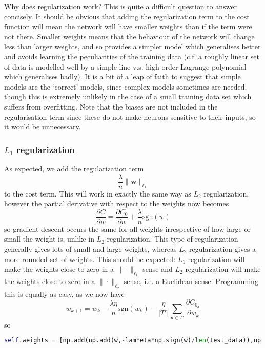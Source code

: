 \documentclass[10pt]{article}
\begin{document}
\par
Why does regularization work? This is quite a difficult question to answer concisely. It should be obvious that adding the regularization term to the cost function will mean the network will have smaller weights than if the term were not there. Smaller weights means that the behaviour of the network will change less than larger weights, and so provides a simpler model which generalises better and avoids learning the peculiarities of the training data (c.f. a roughly linear set of data is modelled well by a simple line v.s. high order Lagrange polynomial which generalises badly). It is a bit of a leap of faith to suggest that simple models are the `correct' models, since complex models sometimes are needed, though this is extremely unlikely in the case of a small training data set which suffers from overfitting. Note that the biases are not included in the regularisation term since these do not make neurons sensitive to their inputs, so it would be unnecessary.

\subsubsection{$L_1$ regularization}
As expected, we add the regularization term
\[
\frac{\lambda}{n}\|\textbf{w}\|_{\ell_1}
\]
to the cost term. This will work in exactly the same way as $L_2$ regularization, however the partial derivative  with respect to the weights now becomes
\[
\frac{\partial C}{\partial w} = \frac{\partial C_0}{\partial w} + \frac{\lambda}{n}\text{sgn}(w)
\]
so gradient descent occurs the same for all weights irrespective of how large or small the weight is, unlike in $L_2$-regularization. This type of regularization generally gives lots of small and large weights, whereas $L_2$ regularization gives a more rounded set of weights. This should be expected: $L_1$ regularization will make the weights close to zero in a $\|\cdot\|_{\ell_1}$ sense and  $L_2$ regularization will make the weights close to zero in a $\|\cdot\|_{\ell_2}$ sense, i.e. a Euclidean sense. Programming this is equally as easy, as we now have
\[
w_{k+1}
=
w_k - \frac{\lambda\eta}{n}\text{sgn}(w_k) - \frac{\eta}{|T'|} \sum_{\mathbf{x} \in T'} \frac{\partial C_{0_\mathbf{x}}}{\partial w_k}
\]
so
\begin{lstlisting}[language=Python, breaklines, basicstyle=\small]
self.weights = [np.add(np.add(w,-lam*eta*np.sign(w)/len(test_data)),np.multiply(-(eta/mini_batch_size),Cw)) for w, Cw in zip(self.weights, dCdw)]
\end{lstlisting}
\end{document}
